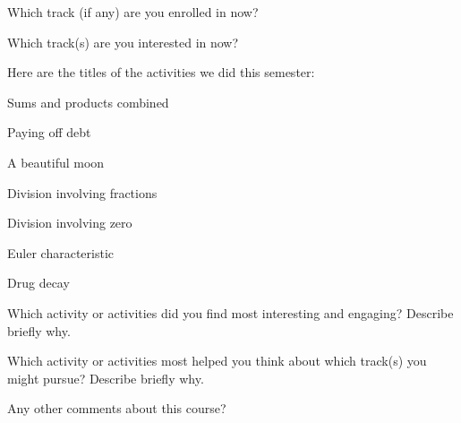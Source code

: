 \documentclass[handout,nooutcomes,space]{ximera}
\begin{document}
\newpage 

\begin{question}
Which track (if any) are you enrolled in now?  
\begin{freeResponse}
\end{freeResponse}
\end{question}

\begin{question}
Which track(s) are you interested in now? 
\begin{freeResponse}
\end{freeResponse}
\end{question}

Here are the titles of the activities we did this semester:  
\begin{description}
\item Sums and products combined
\item Paying off debt
\item A beautiful moon
\item Division involving fractions
\item Division involving zero
\item Euler characteristic
\item Drug decay
\end{description}

\begin{question}
Which activity or activities did you find most interesting and engaging?  Describe briefly why.  
\begin{freeResponse}
\end{freeResponse}
\end{question}


\begin{question}
Which activity or activities most helped you think about which track(s) you might pursue?  Describe briefly why.  
\begin{freeResponse}
\end{freeResponse}
\end{question}

\begin{question}
Any other comments about this course?  
\begin{freeResponse}
\end{freeResponse}
\end{question}
\end{document}
